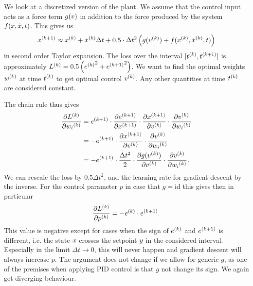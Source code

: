 \documentclass{article}
\begin{document}
    We look at a discretized version of the plant. 
    We assume that the control input acts as a force term $g(v)$ in addition to the force produced 
    by the system $f(x, \dot{x}, t)$. This gives us 
    \begin{align}
        {x}^{(k+1)} \approx {x}^{(k)} + {\dot{x}}^{(k)} \Delta t + 0.5 \cdot \Delta t^2 \left( g({v}^{(k)}) + f({x}^{(k)}, {\dot{x}}^{(k)}, t) \right)
    \end{align}
    in second order Taylor expansion. The loss over the interval $[{t}^{(k)}, {t}^{(k+1)}]$ is approximately
    ${L}^{(k)} = 0.5 \left( {{e}^{(k)}}^2 + {{e}^{(k+1)}}^2 \right)$. 
    We want to find the optimal weights ${w}^{(k)}$ at time ${t}^{(k)}$ to get optimal control ${v}^{(k)}$. 
    Any other quantities at time ${t}^{(k)}$ are considered constant.

    The chain rule thus gives
    \begin{align}
        \frac{\partial {L}^{(k)}}{\partial {w_i}^{(k)}} &= {e}^{(k+1)} \cdot \frac{\partial {e}^{(k+1)}}{\partial {x}^{(k+1)}} 
                                                             \cdot \frac{\partial {x}^{(k+1)}}{\partial {v}^{(k)}} 
                                                             \cdot \frac{\partial {v}^{(k)}}{\partial {w_i}^{(k)}} \nonumber \\
         &= -{e}^{(k+1)} \cdot \frac{\partial {x}^{(k+1)}}{\partial {v}^{(k)}} 
                               \cdot \frac{\partial {v}^{(k)}}{\partial {w_i}^{(k)}} \label{eq:discrete_gradient} \\
                        &= -{e}^{(k+1)} \cdot \frac{\Delta t^2}{2} 
                                              \cdot \frac{\partial g({v}^{(k)})}{\partial {v}^{(k)}} 
                                              \cdot \frac{\partial {v}^{(k)}}{\partial {w_i}^{(k)}}.
    \end{align}
    We can rescale the loss by $0.5 \Delta t^2$, and the learning rate for gradient descent by the inverse. 
    For the control parameter $p$ in case that $g = \mathrm{id}$ this gives then in particular
    \begin{align}
        \frac{\partial {L}^{(k)}}{\partial {p}^{(k)}} = - {e}^{(k)} \cdot {e}^{(k+1)}. \label{eq:diverging_p_local}
    \end{align}
    This value is negative except for cases when the sign of ${e}^{(k)}$ and ${e}^{(k+1)}$ is different, 
    i.e. the state $x$ crosses the setpoint $y$ in the considered interval. 
    Especially in the limit $\Delta t \rightarrow 0$, this will never happen and gradient descent will 
    always increase $p$. The argument does not change if we allow for generic $g$, as one of the premises when applying 
    PID control is that $g$ not change its sign. We again get diverging behaviour.
\end{document}
